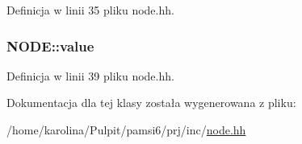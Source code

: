 Definicja w linii 35 pliku node.\-hh.

\hypertarget{class_n_o_d_e_a1a2031f75d5d983b3e1aef6913a6cc4b}{
\subsubsection[{value}]{ N\-O\-D\-E\-::value}}\label{class_n_o_d_e_a1a2031f75d5d983b3e1aef6913a6cc4b}


Definicja w linii 39 pliku node.\-hh.



Dokumentacja dla tej klasy została wygenerowana z pliku\-:\begin{DoxyCompactItemize}
\item 
/home/karolina/\-Pulpit/pamsi6/prj/inc/\hyperlink{node_8hh}{node.\-hh}\end{DoxyCompactItemize}
